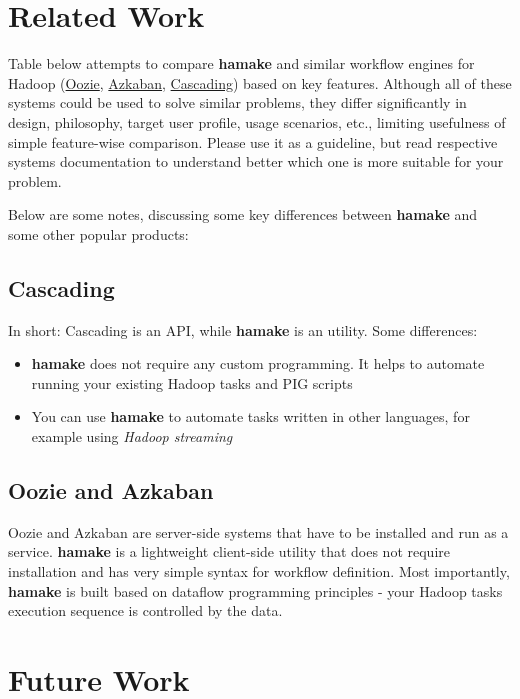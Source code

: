 \documentclass[10pt,conference,letterpaper]{IEEEtran}
\begin{document}
\section{Related Work}

Table below attempts to compare \textbf{hamake} and
similar workflow engines for Hadoop
(\href{http://github.com/tucu00/oozie1}{Oozie},
\href{http://sna-projects.com/azkaban/}{Azkaban},
\href{http://www.cascading.org/}{Cascading}) based on key
features. Although all of these systems could be used to solve similar
problems, they differ significantly in design, philosophy, target user
profile, usage scenarios, etc., limiting usefulness of simple
feature-wise comparison. Please use it as a guideline, but read
respective systems documentation to understand better which one is
more suitable for your problem.


Below are some notes, discussing some key differences between \textbf{hamake}
and some other popular products:

\subsection*{Cascading}

In short: Cascading is an API, while \textbf{hamake} is an utility. Some differences:
\begin{itemize}
\item \textbf{hamake} does not require any custom programming. It helps to automate running your existing Hadoop tasks and PIG scripts
\item You can use \textbf{hamake} to automate tasks written in other languages, for example using \textit{Hadoop streaming}
\end{itemize}

\subsection*{Oozie and Azkaban}

Oozie and Azkaban are server-side systems that have to be installed
and run as a service. \textbf{hamake} is a lightweight client-side
utility that does not require installation and has very simple syntax
for workflow definition.  Most importantly, \textbf{hamake} is built
based on dataflow programming principles - your Hadoop tasks execution
sequence is controlled by the data.

\section{Future Work}
\end{document}
